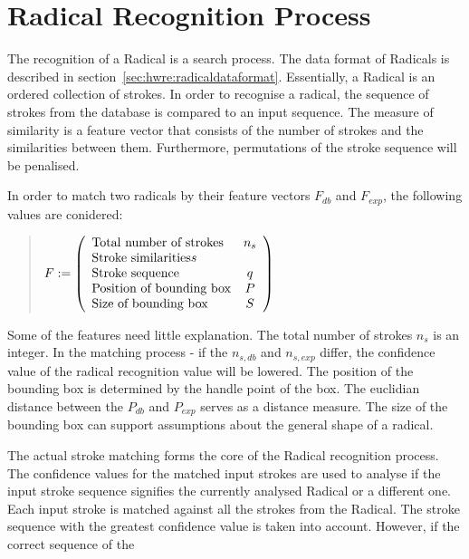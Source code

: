 \section{Radical Recognition Process}
\label{sec:hwre:radicalrecognitionprocess}

The recognition of a Radical is a search process. The data format of Radicals is 
described in section~\ref{sec:hwre:radicaldataformat}.
Essentially, a Radical is an ordered collection of strokes.
In order to recognise a radical, the sequence of strokes from the database
is compared to an input sequence.
The measure of similarity is a feature vector that consists of the number of
strokes and the similarities between them.
Furthermore, permutations of the stroke sequence will be penalised.

In order to match two radicals by their feature vectors \(F_{db} \) 
and \(F_{exp} \), the following values are conidered:
\begin{quote}
\(
    F :=
    \left( 
    \begin {array} {l c} 
        \text{Total number of strokes} & n_{s} \\
        \text{Stroke similarities} s \\ 
        \text{Stroke sequence} & q \\
        \text{Position of bounding box} & P \\
        \text{Size of bounding box} & S \\
    \end {array} 
    \right)
\)
\end{quote}
Some of the features need little explanation. The total number of strokes 
\( n_{s} \) is an integer. In the matching process - if the \(n_{s,db} \) and
\(n_{s,exp} \) differ, the confidence value of the radical recognition value 
will be lowered. The position of the bounding box is determined by the handle
point of the box. The euclidian distance between the \(P_{db}\) and \(P_{exp}\)
serves as a distance measure. The size of the bounding box can support
assumptions about the general shape of a radical.

The actual stroke matching forms the core of the Radical recognition process.
The confidence values for the matched input strokes are used to analyse if the 
input stroke sequence signifies the currently analysed Radical or a different 
one. Each input stroke is matched against all the strokes from the Radical. 
The stroke sequence with the greatest confidence value is taken into account.
However, if the correct sequence of the 



